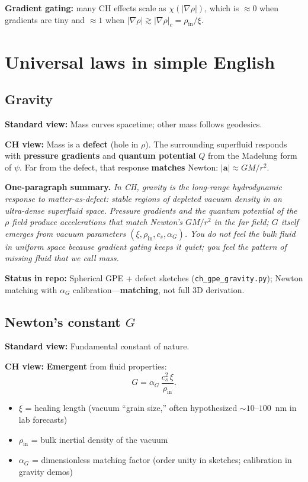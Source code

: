 \documentclass[11pt,a4paper]{article}
\begin{document}
\textbf{Gradient gating:} many CH effects scale as $\chi(|\nabla\rho|)$, which is $\approx 0$ when gradients are tiny and $\approx 1$ when $|\nabla\rho| \gtrsim |\nabla\rho|_c = \rho_{\mathrm{in}}/\xi$.

\section{Universal laws in simple English}
\label{sec:laws}

\subsection{Gravity}
\label{sec:gravity}

\textbf{Standard view:} Mass curves spacetime; other mass follows geodesics.

\textbf{CH view:} Mass is a \textbf{defect} (hole in $\rho$).
The surrounding superfluid responds with \textbf{pressure gradients} and \textbf{quantum potential} $Q$ from the Madelung form of $\psi$.
Far from the defect, that response \textbf{matches} Newton: $|\mathbf{a}| \approx GM/r^2$.

\medskip
\noindent\textbf{One-paragraph summary.}
\emph{In CH, gravity is the long-range hydrodynamic response to matter-as-defect: stable regions of depleted vacuum density in an ultra-dense superfluid space.
Pressure gradients and the quantum potential of the $\rho$ field produce accelerations that match Newton's $GM/r^2$ in the far field; $G$ itself emerges from vacuum parameters $(\xi, \rho_{\mathrm{in}}, c_s, \alpha_G)$.
You do not feel the bulk fluid in uniform space because gradient gating keeps it quiet; you feel the pattern of missing fluid that we call mass.}

\medskip
\noindent\textbf{Status in repo:} Spherical GPE + defect sketches (\texttt{ch\_gpe\_gravity.py}); Newton matching with $\alpha_G$ calibration---\textbf{matching}, not full 3D derivation.

\subsection{Newton's constant $G$}

\textbf{Standard view:} Fundamental constant of nature.

\textbf{CH view:} \textbf{Emergent} from fluid properties:
\begin{equation}
  G = \alpha_G \,\frac{c_s^2\,\xi}{\rho_{\mathrm{in}}}.
\end{equation}
\begin{itemize}[leftmargin=*]
  \item $\xi$ = healing length (vacuum ``grain size,'' often hypothesized $\sim 10$--$100$~nm in lab forecasts)
  \item $\rho_{\mathrm{in}}$ = bulk inertial density of the vacuum
  \item $\alpha_G$ = dimensionless matching factor (order unity in sketches; calibration in gravity demos)
\end{itemize}
\end{document}
